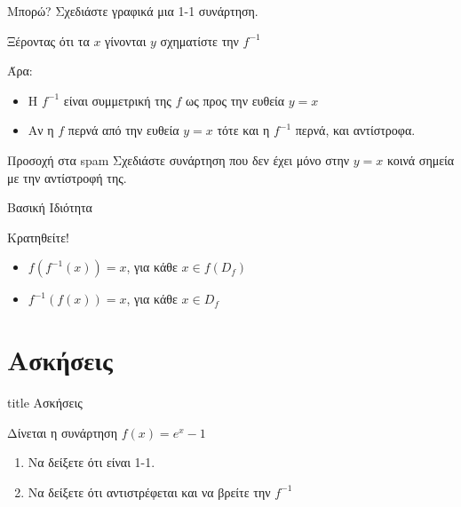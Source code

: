 \documentclass{presentation}
\begin{document}
\begin{frame}{Μπορώ?}
  Σχεδιάστε γραφικά μια 1-1 συνάρτηση. \pause

  Ξέροντας ότι τα $x$ γίνονται $y$ σχηματίστε την $f^{-1}$ \pause

  Άρα:
  \begin{itemize}[<+->]
    \item Η $f^{-1}$ είναι συμμετρική της $f$ ως προς την ευθεία $y=x$
    \item Αν η $f$ περνά από την ευθεία $y=x$ τότε και η $f^{-1}$ περνά, και αντίστροφα.
  \end{itemize} \pause
  \begin{alertblock}{Προσοχή στα spam}
    Σχεδιάστε συνάρτηση που δεν έχει μόνο στην $y=x$ κοινά σημεία με την αντίστροφή της.
  \end{alertblock}
\end{frame}

\begin{frame}{Βασική Ιδιότητα}
  \begin{exampleblock}{Κρατηθείτε!}
    \begin{itemize}[<+->]
      \item $f\left(f^{-1}(x)\right)=x$, για κάθε $x\in f(D_f)$
      \item $f^{-1}\left(f(x)\right)=x$, για κάθε $x\in D_f$
    \end{itemize}
  \end{exampleblock}
\end{frame}


\section{Ασκήσεις}

\begin{frame}[noframenumbering]
  \vfill
  \centering
  \begin{beamercolorbox}[sep=8pt,center,shadow=true,rounded=true]{title}
    Ασκήσεις
  \end{beamercolorbox}
  \vfill
\end{frame}

\begin{askisi}
  Δίνεται η συνάρτηση $f(x)=e^x-1$
  \begin{enumerate}[<+->]
    \item Να δείξετε ότι είναι 1-1.
    \item Να δείξετε ότι αντιστρέφεται και να βρείτε την $f^{-1}$
  \end{enumerate}
\end{askisi}
\end{document}
